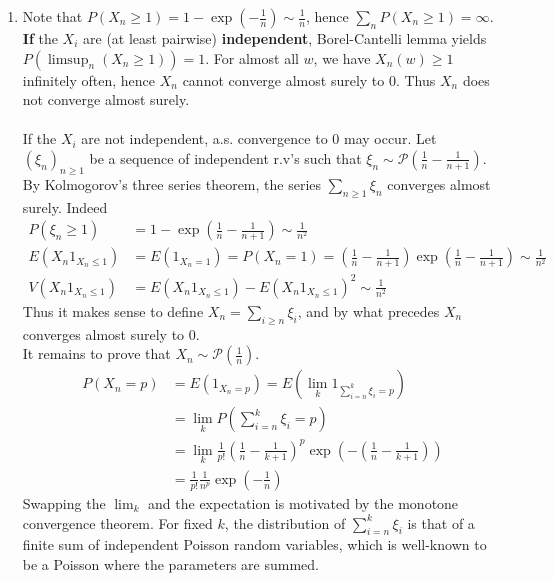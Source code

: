 \documentclass[a4paper,11pt]{article}
\begin{document}
\begin{enumerate}
\begin{enumerate}
    \item Note that $P(X_n\geq 1) = 1-\exp(-\frac 1n)\sim \frac 1n$, hence $\sum_n P(X_n\geq 1) = \infty$.\\
    \textbf{If} the $X_i$ are (at least pairwise) \textbf{independent}, Borel-Cantelli lemma yields \\
    $P\left(\limsup_n \left(X_n\geq 1\right)\right)=1$. For almost all $w$, we have $X_n(w)\geq 1$ infinitely often, hence $X_n$ cannot converge almost surely to $0$. Thus $X_n$ does not converge almost surely.\\\\
    If the $X_i$ are not independent, a.s. convergence to $0$ may occur. Let $(\xi_n)_{n\geq 1}$ be a sequence of independent r.v's such that $\xi_n \sim \mathcal P(\frac{1}{n}-\frac{1}{n+1})$. By Kolmogorov's three series theorem, the series $\sum_{n\geq 1} \xi_n$ converges almost surely. Indeed 
    $$\begin{aligned}P(\xi_n \geq 1) &= 1 - \exp(\frac{1}{n}-\frac{1}{n+1}) \sim \frac{1}{n^2}\\
    E(X_n 1_{X_n\leq 1}) &= E(1_{X_n= 1}) = P(X_n= 1)=\left(\frac{1}{n}-\frac{1}{n+1}\right)\exp(\frac{1}{n}-\frac{1}{n+1}) \sim \frac{1}{n^2}\\
    V(X_n 1_{X_n\leq 1}) &= E(X_n 1_{X_n\leq 1}) - E(X_n 1_{X_n\leq 1})^2 \sim \frac{1}{n^2}
    \end{aligned}
    $$
    Thus it makes sense to define $X_n=\sum_{i\geq n} \xi_i$, and by what precedes $X_n$ converges almost surely to $0$.\\
    It remains to prove that $X_n\sim \mathcal P(\frac 1n)$. 
    $$\begin{aligned}P(X_n=p) &= E(1_{X_n=p}) =  E(\lim_k1_{\sum_{i=n}^k\xi_i=p})\\
&= \lim_k P(\sum_{i=n}^k\xi_i=p)\\
&= \lim_k \frac{1}{p!}\left(\frac 1n - \frac 1{k+1}\right)^p \exp\left(-(\frac 1n - \frac 1{k+1})\right) \\
&= \frac{1}{p!}\frac 1{n^p} \exp(-\frac 1n)
\end{aligned}$$
    Swapping the $\lim_k$ and the expectation is motivated by the monotone convergence theorem. For fixed $k$, the distribution of $\sum_{i=n}^k\xi_i$ is that of a finite sum of independent Poisson random variables, which is well-known to be a Poisson where the parameters are summed.
    \end{enumerate}
  
\end{enumerate}
\end{document}
